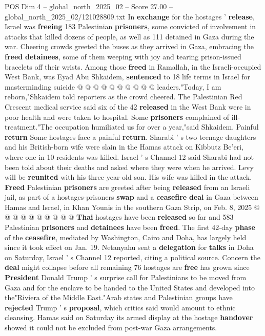\begin{textsample}{POS Dim 4 – global\_north\_2025\_02 – Score 27.00 – global\_north\_2025\_02/121028809.txt}
In \textbf{exchange} for the hostages ' \textbf{release}, Israel was \textbf{freeing} 183 Palestinian \textbf{prisoners}, some convicted of involvement in attacks that killed dozens of people, as well as 111 detained in Gaza during the war.
Cheering crowds greeted the buses as they arrived in Gaza, embracing the \textbf{freed} \textbf{detainees}, some of them weeping with joy and tearing prison-issued bracelets off their wrists.
Among those \textbf{freed} in Ramallah, in the Israeli-occupied West Bank, was Eyad Abu Shkaidem, \textbf{sentenced} to 18 life terms in Israel for masterminding suicide @ @ @ @ @ @ @ @ @ @ leaders."Today, I am reborn,"Shkaidem told reporters as the crowd cheered.
The Palestinian Red Crescent medical service said six of the 42 \textbf{released} in the West Bank were in poor health and were taken to hospital.
Some \textbf{prisoners} complained of ill-treatment."The occupation humiliated us for over a year,"said Shkaidem.
Painful \textbf{return} Some hostages face a painful \textbf{return}.
Sharabi ' s two teenage daughters and his British-born wife were slain in the Hamas attack on Kibbutz Be'eri, where one in 10 residents was killed.
Israel ' s Channel 12 said Sharabi had not been told about their deaths and asked where they were when he arrived.
Levy will be \textbf{reunited} with his three-year-old son.
His wife was killed in the attack. \textbf{Freed} Palestinian \textbf{prisoners} are greeted after being \textbf{released} from an Israeli jail, as part of a hostages-prisoners \textbf{swap} and a \textbf{ceasefire} \textbf{deal} in Gaza between Hamas and Israel, in Khan Younis in the southern Gaza Strip, on Feb. 8, 2025 @ @ @ @ @ @ @ @ @ @ \textbf{Thai} hostages have been \textbf{released} so far and 583 Palestinian \textbf{prisoners} and \textbf{detainees} have been \textbf{freed}.
The first 42-day \textbf{phase} of the \textbf{ceasefire}, mediated by Washington, Cairo and Doha, has largely held since it took effect on Jan. 19.
Netanyahu sent a \textbf{delegation} for \textbf{talks} in Doha on Saturday, Israel ' s Channel 12 reported, citing a political source.
Concern the \textbf{deal} might collapse before all remaining 76 hostages are \textbf{free} has grown since \textbf{President} Donald Trump ' s surprise call for Palestinians to be moved from Gaza and for the enclave to be handed to the United States and developed into the"Riviera of the Middle East."Arab states and Palestinian groups have \textbf{rejected} Trump ' s \textbf{proposal}, which critics said would amount to ethnic cleansing.
Hamas said on Saturday its armed display at the hostage \textbf{handover} showed it could not be excluded from post-war Gaza arrangements.

\end{textsample}
